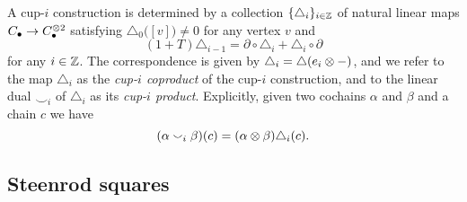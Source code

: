A cup-$i$ construction is determined by a collection $\{\triangle_i\}_{i \in \mathbb{Z}}$ of natural linear maps $C_\bullet \to C_\bullet^{\otimes 2}$ satisfying $\triangle_0 \big([v]\big) \neq 0$ for any vertex $v$ and
\begin{equation} \label{e:boundary of cup-i}
(1 + T) \triangle_{i-1} = \partial \circ \triangle_i + \triangle_i \circ \partial
\end{equation}
for any $i \in \mathbb{Z}$.
The correspondence is given by $\triangle_i = \triangle(e_i \otimes -)$, and we refer to the map $\triangle_i$ as the \textit{cup-$i$ coproduct} of the cup-$i$ construction, and to the linear dual $\smallsmile_i$ of $\triangle_i$ as its \textit{cup-$i$ product}.
Explicitly, given two cochains $\alpha$ and $\beta$ and a chain $c$ we have
\begin{equation*}
(\alpha \smallsmile_i \beta)(c) = (\alpha \otimes \beta) \triangle_i(c).
\end{equation*}

\subsection{Steenrod squares}

